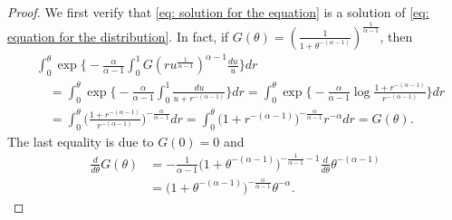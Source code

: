 \documentclass[12pt,a4paper]{amsart}
\theoremstyle{definition}
\numberwithin{equation}{section}
\begin{document}
\begin{proof}
	We first verify that \eqref{eq: solution for the equation}  is a solution of \eqref{eq: equation for the distribution}.
	In fact, if $G(\theta) = (\frac{1}{1+ \theta^{-(\alpha - 1)}})^{\frac{1}{\alpha - 1}}$, then
  \begin{align}
    & \int_0^\theta \exp\Big\{- \frac{\alpha} {\alpha - 1} \int_0^1 G(ru^{\frac{1}{\alpha - 1}})^{\alpha - 1}\frac{du}{u}\Big\} dr
    \\ & \quad = \int_0^\theta \exp\Big\{- \frac{\alpha} {\alpha - 1} \int_0^1 \frac{du}{u+r^{-(\alpha - 1)}} \Big\} dr
         = \int_0^\theta \exp\Big\{- \frac{\alpha} {\alpha - 1} \log \frac {1+r^{-(\alpha - 1)}} {r^{-(\alpha - 1)} } \Big\} dr
    \\ & \quad = \int_0^\theta \big(\frac{1+r^{-(\alpha - 1)}}{r^{-(\alpha - 1)} }\big)^{- \frac{\alpha} {\alpha - 1}} dr
         = \int_0^\theta \big( 1 + r^{ - ( \alpha - 1 ) } \big)^{- \frac{\alpha} {\alpha - 1}} r^{-\alpha} dr
         = G(\theta).
  \end{align}
	The last equality is due to $G(0) = 0$ and
  \begin{align}
    \frac{d}{d\theta}G(\theta)
    &= - \frac{1}{\alpha - 1} \big(1+\theta^{-(\alpha - 1)}\big)^{- \frac{1}{\alpha - 1} - 1} \frac{d}{d\theta} \theta^{-(\alpha - 1)}
    \\& =  \big(1+\theta^{-(\alpha - 1)}\big)^{- \frac{\alpha}{\alpha - 1} } \theta^{-\alpha}.
\end{align}
	

\end{proof}
\end{document}
